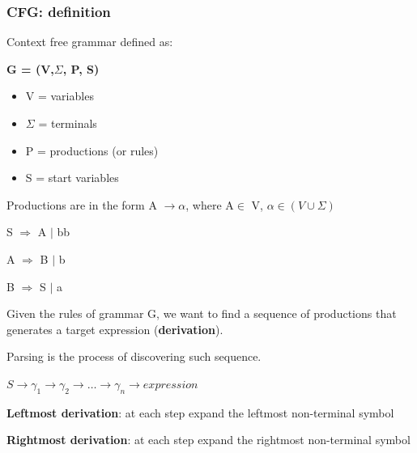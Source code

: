 \documentclass{beamer}
\begin{document}
    \begin{frame}
        \frametitle{CFG: definition}
        Context free grammar defined as:
        \begin{center}
            \textbf{G = (V,$\Sigma$, P, S)}
        \end{center}
        \begin{itemize}
            \item V = variables
            \item $\Sigma$ = terminals
            \item P = productions (or rules)
            \item S = start variables
        \end{itemize}
        Productions are in the form A $\rightarrow \alpha$, where A$\in$ V, $\alpha \in (V \cup \Sigma)$

        S $\Rightarrow$ A $|$ bb
        
        A $\Rightarrow$ B $|$ b 
       
        B $\Rightarrow$ S $|$ a
    \end{frame}
    \begin{frame}
        
            \begin{block}{}
            Given the rules of grammar G, we want to find a sequence of productions that 
            generates a target expression (\textbf{derivation}).
        
            
            \end{block}
            \begin{block}{}
            Parsing is the process of discovering such sequence.
            \end{block}
            
            $ S \rightarrow \gamma_{1} \rightarrow \gamma_{2} \rightarrow \dots \rightarrow \gamma_{n} \rightarrow expression$
            
            \begin{block}{}\textbf{Leftmost derivation}: at each step expand the leftmost non-terminal symbol\end{block}
            
            \begin{block}{}\textbf{Rightmost derivation}: at each step expand the rightmost non-terminal symbol\end{block}
            
    \end{frame}
\end{document}
